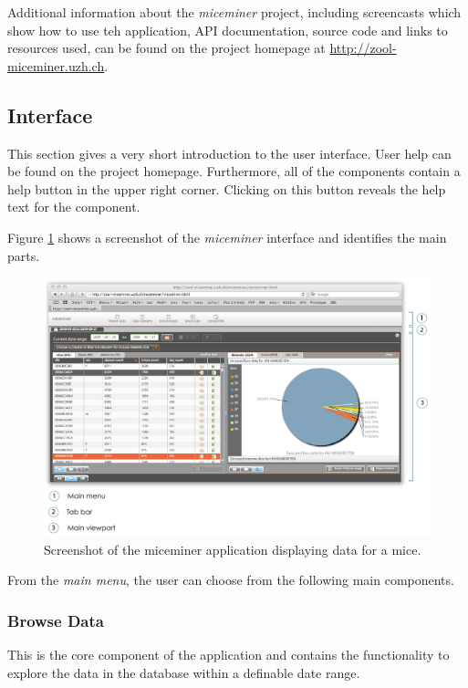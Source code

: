 Additional information about the \textit{miceminer} project, including screencasts which show how to use teh application, \ac{API} documentation, source code and links to resources used, can be found on the project homepage at \href{http://zool-miceminer.uzh.ch/}{http://zool-miceminer.uzh.ch}. 

\subsection{Interface}
\label{subsec:miceminer_interface}

This section gives a very short introduction to the user interface. User help can be found on the project homepage. Furthermore, all of the components contain a help button in the upper right corner. Clicking on this button reveals the help text for the component.

Figure \ref{fig:interface_overview} shows a screenshot of the \textit{miceminer} interface and identifies the main parts. 

\begin{figure}[!ht]
\begin{center}
  \includegraphics[width=\textwidth]{assets/pdf/interface_overview.pdf}
  \caption[miceminer interface overview]{Screenshot of the miceminer application displaying data for a mice.}
  \label{fig:interface_overview}
\end{center}
\end{figure}

From the \textit{main menu}, the user can choose from the following main components.

\subsubsection*{Browse Data}
This is the core component of the application and contains the functionality to explore the data in the database within a definable date range.

